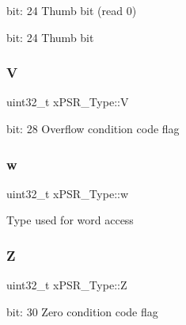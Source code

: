 bit\+: 24 Thumb bit (read 0)

bit\+: 24 Thumb bit \mbox{\label{unionx_p_s_r___type_af14df16ea0690070c45b95f2116b7a0a}} 
\subsubsection{\texorpdfstring{V}{V}}
{\footnotesize\ttfamily uint32\+\_\+t x\+P\+S\+R\+\_\+\+Type\+::V}

bit\+: 28 Overflow condition code flag \mbox{\label{unionx_p_s_r___type_a1a47176768f45f79076c4f5b1b534bc2}} 
\subsubsection{\texorpdfstring{w}{w}}
{\footnotesize\ttfamily uint32\+\_\+t x\+P\+S\+R\+\_\+\+Type\+::w}

Type used for word access \mbox{\label{unionx_p_s_r___type_a1e5d9801013d5146f2e02d9b7b3da562}} 
\subsubsection{\texorpdfstring{Z}{Z}}
{\footnotesize\ttfamily uint32\+\_\+t x\+P\+S\+R\+\_\+\+Type\+::Z}

bit\+: 30 Zero condition code flag 

